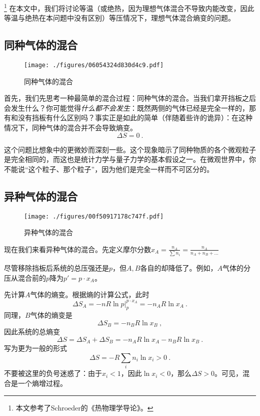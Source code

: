 

\footnote{本文参考了Schroeder的《热物理学导论》。} 在本文中，我们将讨论等温（或绝热，因为理想气体混合不导致内能改变，因此等温与绝热在本问题中没有区别）等压情况下，理想气体混合熵变的问题。

\subsection{同种气体的混合}
\begin{figure}[ht]
\centering
\texttt{[image: ./figures/06054324d830d4c9.pdf]}
\caption{同种气体的混合} \label{fig_IGME_1}
\end{figure}
首先，我们先思考一种最简单的混合过程：同种气体的混合。当我们拿开挡板之后会发生什么？你可能觉得\textsl{什么都不会发生}：既然两侧的气体已经是完全一样的，那有和没有挡板有什么区别吗？事实正是如此的简单（伴随着些许的诡异）：在这种情况下，同种气体的混合并不会导致熵变。
\begin{equation}
\Delta S = 0~.
\end{equation}


这个问题比想象中的更微妙而深刻一些。这个现象暗示了同种物质的各个微观粒子是完全相同的，而这也是统计力学与量子力学的基本假设之一。在微观世界中，你不能说“这个粒子、那个粒子”，因为他们是完全一样而不可区分的。

\subsection{异种气体的混合}
\begin{figure}[ht]
\centering
\texttt{[image: ./figures/00f50917178c747f.pdf]}
\caption{异种气体的混合} \label{fig_IGME_2}
\end{figure}

现在我们来看异种气体的混合。先定义摩尔分数$x_A = \frac{n_A}{\sum n_i} = \frac{n_A}{n_A+n_B+...}$

尽管移除挡板后系统的总压强还是$p$，但$A, B$各自的却降低了。例如，$A$气体的分压从混合前的$p$降为$p'=p \cdot x_A$。

先计算$A$气体的熵变。根据熵的计算公式，此时
$$
\Delta S_A=-nR\ln p |^{p \cdot x_A}_p=-n_A R \ln x_A~.
$$
同理，$B$气体的熵变是
$$
\Delta S_B=-n_B R \ln x_B~,
$$
因此系统的总熵变
$$
\Delta S = \Delta S_A+\Delta S_B= -n_A R \ln x_A - n_B R \ln x_B~.
$$
写为更为一般的形式
\begin{equation}
\Delta S = -R \sum_i n_i \ln x_i >0~.
\end{equation}
不要被这里的负号迷惑了：由于$x_i<1$，因此$\ln x_i < 0$，那么$\Delta S>0$。可见，混合是一个熵增过程。


